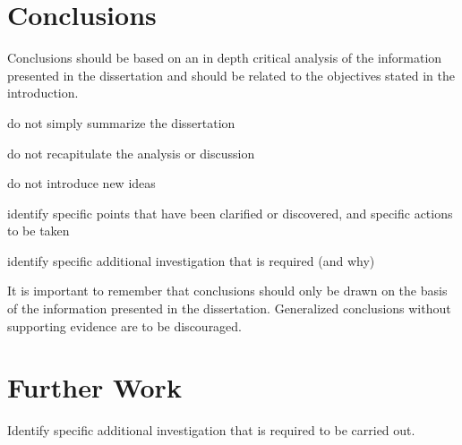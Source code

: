 \section{Conclusions}
Conclusions should be based on an in depth critical analysis of the information presented in the dissertation and should be related to the objectives stated in the introduction.

\newpage
do not simply summarize the dissertation

do not recapitulate the analysis or discussion

do not introduce new ideas

identify specific points that have been clarified or discovered, and specific actions to be taken

identify specific additional investigation that is required (and why)

\newpage
It is important to remember that conclusions should only be drawn on the basis of the information presented in the dissertation. Generalized conclusions without supporting evidence are to be
discouraged.
\newpage

\section{Further Work}
Identify specific additional investigation that is required to be carried out.

\newpage
